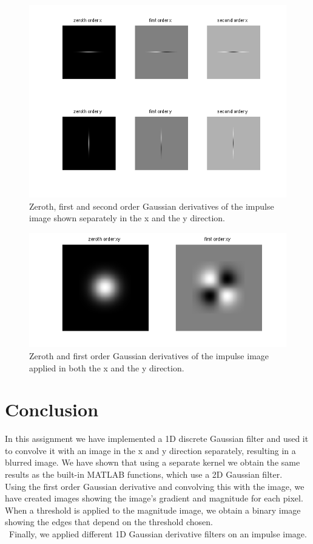 \documentclass[a4paper]{article}
\begin{document}
\begin{figure}[H]
  \centering
    \includegraphics[width=0.95 \textwidth]{xy.png}
  \caption{Zeroth, first and second order Gaussian derivatives of the impulse image shown separately in the x and the y direction.}
  \label{fig:dot}
\end{figure}

\begin{figure}[H]
  \centering
    \includegraphics[width=0.95 \textwidth]{new.png}
  \caption{Zeroth and first order Gaussian derivatives of the impulse image applied in both the x and the y direction.}
  \label{fig:dot}
\end{figure}

\section{Conclusion}
In this assignment we have implemented a 1D discrete Gaussian filter and used it to convolve it with an image in the x and y direction separately, resulting in a blurred image. We have shown that using a separate kernel we obtain the same results as the built-in MATLAB functions, which use a 2D Gaussian filter. \\
Using the first order Gaussian derivative and convolving this with the image, we have created images showing the image's gradient and magnitude for each pixel. When a threshold is applied to the magnitude image, we obtain a binary image showing the edges that depend on the threshold chosen.\\\
Finally, we applied different 1D Gaussian derivative filters on an impulse image. 
\end{document}
